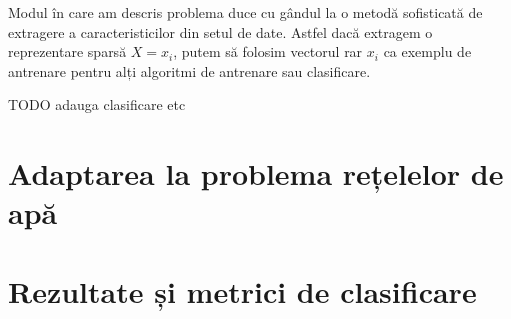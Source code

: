 Modul în care am descris problema duce cu gândul la o metodă sofisticată de extragere a caracteristicilor din setul de date. Astfel dacă extragem o reprezentare sparsă $X = {x_i}$, putem să folosim vectorul rar $x_i$ ca exemplu de antrenare pentru alți algoritmi de antrenare sau clasificare.


TODO adauga clasificare etc




\section{Adaptarea la problema rețelelor de apă}

\section{Rezultate și metrici de clasificare}
